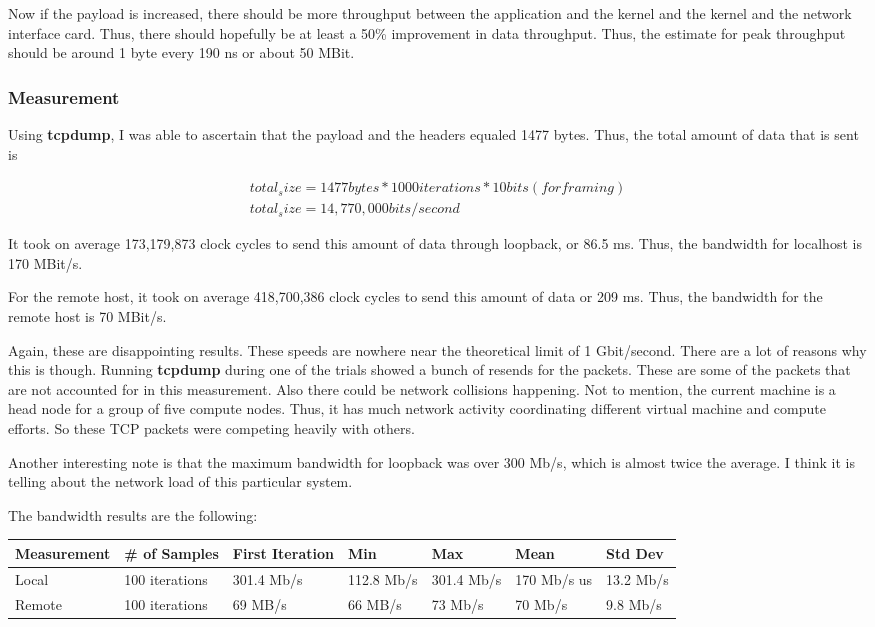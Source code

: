 \documentclass[paper=a4, fontsize=11pt]{scrartcl}
\numberwithin{equation}{section}        %
\numberwithin{figure}{section}          %
\numberwithin{table}{section}               %
\begin{document}
Now if the payload is increased, there should be more throughput between the application and the kernel and the kernel and the network interface card.  Thus, there should hopefully be at least a 50\% improvement in data throughput.  Thus, the estimate for peak throughput should be around 1 byte every 190 ns or about 50 MBit.

\subsubsection{Measurement}

Using \textbf{tcpdump}, I was able to ascertain that the payload and the headers equaled 1477 bytes.  Thus, the total amount of data that is sent is 

\begin{gather}
total_size = 1477 bytes * 1000 iterations * 10 bits (for framing) \\
total_size = 14,770,000 bits/second
\end{gather}

It took on average 173,179,873 clock cycles to send this amount of data through loopback, or 86.5 ms.  Thus, the bandwidth for localhost is 170 MBit/s.

For the remote host, it took on average 418,700,386 clock cycles to send this amount of data or 209 ms.  Thus, the bandwidth for the remote host is 70 MBit/s.

Again, these are disappointing results.  These speeds are nowhere near the theoretical limit of 1 Gbit/second.  There are a lot of reasons why this is though.  Running \textbf{tcpdump} during one of the trials showed a bunch of resends for the packets.  These are some of the packets that are not accounted for in this measurement.  Also there could be network collisions happening.  Not to mention, the current machine is a head node for a group of five compute nodes.  Thus, it has much network activity coordinating different virtual machine and compute efforts.  So these TCP packets were competing heavily with others.

Another interesting note is that the maximum bandwidth for loopback was over 300 Mb/s, which is almost twice the average.  I think it is telling about the network load of this particular system.

The bandwidth results are the following:

\begin{center}
    \begin{tabular}{ | l | l | l | l | l | l | l |}
    \hline
    Measurement & \# of Samples & First Iteration & Min & Max & Mean & Std Dev \\
    \hline
    Local & 100 iterations & 301.4 Mb/s & 112.8 Mb/s & 301.4 Mb/s & 170 Mb/s us & 13.2 Mb/s \\ 
    Remote & 100 iterations & 69 MB/s & 66 MB/s & 73 Mb/s & 70 Mb/s & 9.8 Mb/s \\
    \hline
    \end{tabular}
\end{center}
\end{document}
